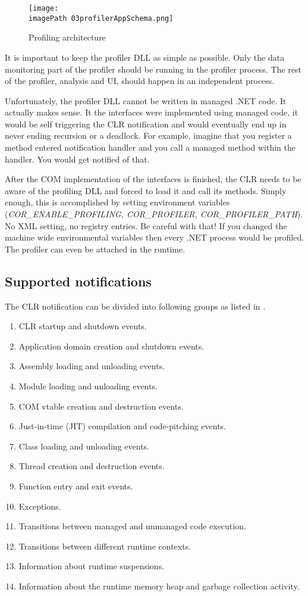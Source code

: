 \begin{figure}
	\centering
		\texttt{[image: \\imagePath 03profilerAppSchema.png]}
		\caption{Profiling architecture \cite{ProfMSDN} }
	\label{fig:03profilerAppSchema}
\end{figure}

It is important to keep the profiler DLL as simple as possible. Only the data monitoring part of the profiler should be running in the profiler process. The rest of the profiler, analysis and UI, should happen in an independent process.

Unfortunately, the profiler DLL cannot be written in managed .NET code. It actually makes sense. It the interfaces were implemented using managed code, it would be self triggering the CLR notification and would eventually end up in never ending recursion or a deadlock. For example, imagine that you register a method entered notification handler and you call a managed method within the handler. You would get notified of that.

After the COM implementation of the interfaces is finished, the CLR needs to be aware of the profiling DLL and forced to load it and call its methods. Simply enough, this is accomplished by setting
 environment variables (\textit{COR\_ENABLE\_PROFILING, COR\_PROFILER, COR\_PROFILER\_PATH}). No XML setting, no registry entries. Be careful with that! If you changed the machine wide environmental variables then every .NET process would be profiled. The profiler can even be attached in the runtime.

\subsection{Supported notifications}
The CLR notification can be divided into following groups as listed in \cite{ProfMSDN}.

\begin{enumerate}
\item CLR startup and shutdown events.
\item Application domain creation and shutdown events.
\item Assembly loading and unloading events.
\item Module loading and unloading events.
\item COM vtable creation and destruction events.
\item Just-in-time (JIT) compilation and code-pitching events.
\item Class loading and unloading events.
\item Thread creation and destruction events.
\item Function entry and exit events.
\item Exceptions.
\item Transitions between managed and unmanaged code execution.
\item Transitions between different runtime contexts.
\item Information about runtime suspensions.
\item Information about the runtime memory heap and garbage collection activity.
\end{enumerate}

